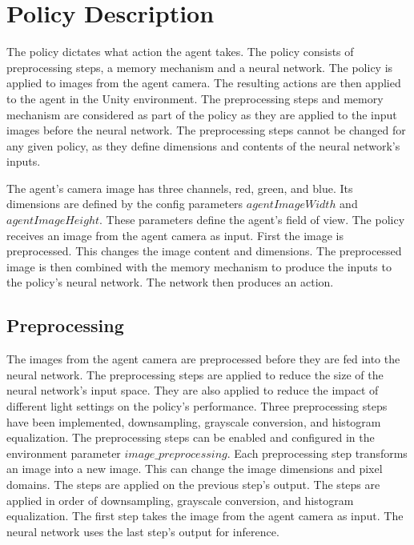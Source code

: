 
\section{Policy Description}

\label{fig:policy_description}

The policy dictates what action the agent takes. The policy consists of preprocessing steps, a memory mechanism and a neural network. The policy is applied to images from the agent camera. The resulting actions are then applied to the agent in the Unity environment. 
The preprocessing steps and memory mechanism are considered as part of the policy as they are applied to the input images before the neural network. The preprocessing steps cannot be changed for any given policy, as they define dimensions and contents of the neural network's inputs.

The agent's camera image has three channels, red, green, and blue. Its dimensions are defined by the config parameters $agentImageWidth$ and $agentImageHeight$. These parameters define the agent's field of view.
The policy receives an image from the agent camera as input. First the image is preprocessed. This changes the image content and dimensions. The preprocessed image is then combined with the memory mechanism to produce the inputs to the policy's neural network. The network then produces an action.


\subsection{Preprocessing}

The images from the agent camera are preprocessed before they are fed into the neural network. The preprocessing steps are applied to reduce the size of the neural network's input space. They are also applied to reduce the impact of different light settings on the policy's performance.
Three preprocessing steps have been implemented, downsampling, grayscale conversion, and histogram equalization. The preprocessing steps can be enabled and configured in the environment parameter $image\_preprocessing$. Each preprocessing step transforms an image into a new image. This can change the image dimensions and pixel domains. The steps are applied on the previous step's output. The steps are applied in order of downsampling, grayscale conversion, and histogram equalization. The first step takes the image from the agent camera as input. 
The neural network uses the last step's output for inference.

